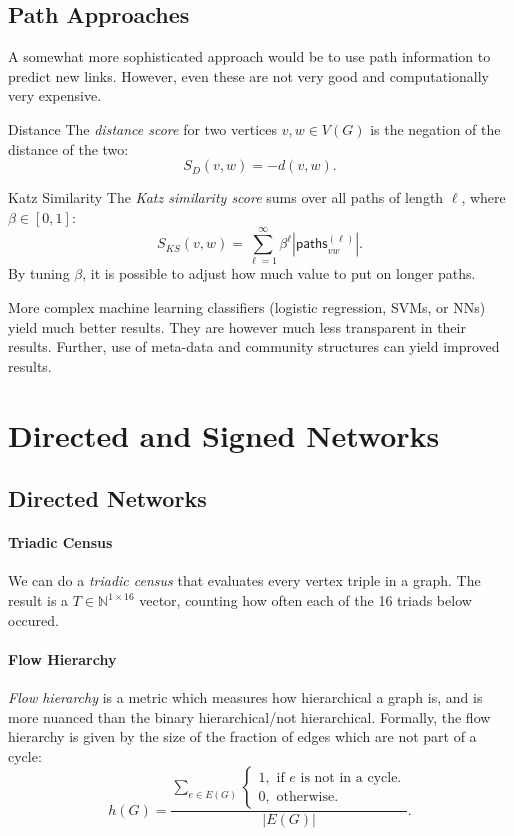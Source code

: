 \documentclass[english]{panikzettel}
\newcommand{\N}{\mathbb{N}}
\begin{document}
\subsection{Path Approaches}

A somewhat more sophisticated approach would be to use path information to predict new links. However, even these are not very good and computationally very expensive.

\begin{defi}{Distance}
    The \textit{distance score} for two vertices $v,w \in V(G)$ is the negation of the distance of the two:
    \[
        S_D(v,w) = -d(v,w).
    \]
\end{defi}

\begin{defi}{Katz Similarity}
    The \textit{Katz similarity score} sums over all paths of length $\ell$, where $\beta \in [0,1]$:
    \[
        S_{KS}(v,w) = \sum_{\ell=1}^{\infty} \beta^\ell \left|\textsf{paths}_{vw}^{(\ell)}\right|.
    \]
    By tuning $\beta$, it is possible to adjust how much value to put on longer paths.
\end{defi}

More complex machine learning classifiers (logistic regression, SVMs, or NNs) yield much better results.
They are however much less transparent in their results.
Further, use of meta-data and community structures can yield improved results.

\section{Directed and Signed Networks}

\subsection{Directed Networks}

\paragraph{Triadic Census}
We can do a \emph{triadic census} that evaluates every vertex triple in a graph.
The result is a $T \in \N^{1 \times 16}$ vector, counting how often each of the 16 triads below occured.



\paragraph{Flow Hierarchy}
\textit{Flow hierarchy} is a metric which measures how hierarchical a graph is, and is more nuanced than the binary hierarchical/not hierarchical.
Formally, the flow hierarchy is given by the size of the fraction of edges which are not part of a cycle:
\[
    h(G) = \frac{\sum_{e \in E(G)} \begin{cases}1, \text{ if } e \text{ is not in a cycle.}\\0, \text{ otherwise.} \end{cases}}{|E(G)|}.
\]
\end{document}
